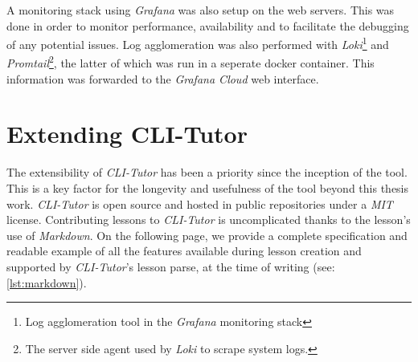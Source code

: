A monitoring stack using \textit{Grafana} was also setup on the web servers.
This was done in order to monitor performance, availability and to facilitate
the debugging of any potential issues. Log agglomeration was also performed
with \textit{Loki}\footnote{Log agglomeration tool in the \textit{Grafana}
monitoring stack} and \textit{Promtail}\footnote{The server side agent used by 
    \textit{Loki} to scrape system logs.}, the latter of which was run in a
    seperate docker  container. This information was forwarded to the
    \textit{Grafana Cloud} web interface.

\section{Extending CLI-Tutor}

The extensibility of \textit{CLI-Tutor} has been a priority since the inception
of the tool. This is a key factor for the longevity and usefulness of the tool
beyond this thesis work. \textit{CLI-Tutor} is open source and hosted in public
repositories under a \textit{MIT}\cite{mitlicense} license. Contributing
lessons to \textit{CLI-Tutor} is uncomplicated thanks to the lesson's use of
\textit{Markdown}. On the following page, we provide a complete
specification and readable example of all the features available during lesson
creation and supported by \textit{CLI-Tutor}'s lesson parse, at the time of
writing (see: \autoref{lst:markdown}).


